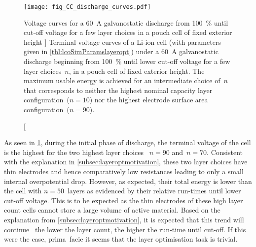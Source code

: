 

\begin{figure}[!bp]
        \centering
        \texttt{[image: fig\_CC\_discharge\_curves.pdf]}
        \captionsetup{labelsep=note}
        \caption
        [%
        Voltage curves for a \SI{60}{\ampere} galvanostatic discharge from
        \SI{100}{\percent}  until cut-off voltage for a few layer
        choices in a pouch cell of fixed exterior height
        ]%
        {%
            Terminal voltage curves of a Li-ion cell (with parameters
            given in \cref{tbl:lcoSimParamslayeropt}) under a \SI{60}{\ampere}
            galvanostatic discharge beginning from \SI{100}{\percent}
             until lower cut-off voltage for a few layer
            choices~$n$, in a pouch cell of fixed exterior height. The maximum
            usable energy is achieved for an intermediate choice of~$n$
            that corresponds to neither the highest nominal capacity layer
            configuration~(${n= 10}$) nor the highest electrode surface area
            configuration~(${n = 90}$).
        }%
        \label{fig:fig_CC_discharge_curves}

\end{figure}

As  seen  in \cref{fig:fig_CC_discharge_curves},  during  the  initial phase  of
discharge, the terminal voltage  of the cell is the highest  for the two highest
layer  choices \ie~${n  =  90}$ and~${n=70}$. Consistent  with  the explanation  in
\cref{subsec:layeroptmotivation}, these  two layer choices have  thin electrodes
and  hence  comparatively low  resistances  leading  to  only a  small  internal
overpotential drop. However,  as expected, their total energy is  lower than the
cell with  ${n=50}$~layers as  evidenced by  their relative run-times  until lower
cut-off voltage.  This is to  be expected as the  thin electrodes of  these high
layer count cells cannot  store a large volume of active  material. Based on the
explanation  from \cref{subsec:layeroptmotivation},  it  is  expected that  this
trend will continue \ie~the lower the layer count, the higher the run-time until
cut-off. If this were the case, prima~facie it seems that the layer optimisation
task is trivial.

